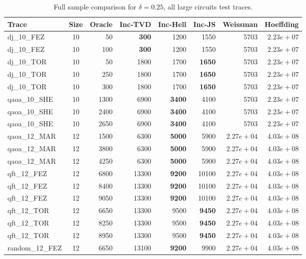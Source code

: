\clearpage
\begin{table}[ht!]
\centering
\footnotesize
\setlength{\tabcolsep}{3pt}
\renewcommand{\arraystretch}{1.05}
\caption{Full sample comparison for $\delta = 0.25$, all large circuits test traces.}
\label{tab:appendix-sota-d025-l}
\begin{tabular}{l c r r r r r r}
\toprule
Trace & Size & Oracle & Inc-TVD & Inc-Hell & Inc-JS & Weissman & Hoeffding \\
\midrule
dj\_10\_FEZ & 10 & 50 & \textbf{300} & 1200 & 1550 & 5703 & $2.23e+07$ \\
dj\_10\_FEZ & 10 & 100 & \textbf{300} & 1200 & 1550 & 5703 & $2.23e+07$ \\
dj\_10\_TOR & 10 & 50 & 1800 & 1700 & \textbf{1650} & 5703 & $2.23e+07$ \\
dj\_10\_TOR & 10 & 250 & 1800 & 1700 & \textbf{1650} & 5703 & $2.23e+07$ \\
dj\_10\_TOR & 10 & 300 & 1800 & 1700 & \textbf{1650} & 5703 & $2.23e+07$ \\
qaoa\_10\_SHE & 10 & 1300 & 6900 & \textbf{3400} & 4100 & 5703 & $2.23e+07$ \\
qaoa\_10\_SHE & 10 & 2400 & 6900 & \textbf{3400} & 4100 & 5703 & $2.23e+07$ \\
qaoa\_10\_SHE & 10 & 2650 & 6900 & \textbf{3400} & 4100 & 5703 & $2.23e+07$ \\
qaoa\_12\_MAR & 12 & 1500 & 6300 & \textbf{5000} & 5900 & $2.27e+04$ & $4.03e+08$ \\
qaoa\_12\_MAR & 12 & 3800 & 6300 & \textbf{5000} & 5900 & $2.27e+04$ & $4.03e+08$ \\
qaoa\_12\_MAR & 12 & 4250 & 6300 & \textbf{5000} & 5900 & $2.27e+04$ & $4.03e+08$ \\
qft\_12\_FEZ & 12 & 6800 & 13300 & \textbf{9200} & 10100 & $2.27e+04$ & $4.03e+08$ \\
qft\_12\_FEZ & 12 & 8400 & 13300 & \textbf{9200} & 10100 & $2.27e+04$ & $4.03e+08$ \\
qft\_12\_FEZ & 12 & 9050 & 13300 & \textbf{9200} & 10100 & $2.27e+04$ & $4.03e+08$ \\
qft\_12\_TOR & 12 & 6650 & 13300 & 9500 & \textbf{9450} & $2.27e+04$ & $4.03e+08$ \\
qft\_12\_TOR & 12 & 8250 & 13300 & 9500 & \textbf{9450} & $2.27e+04$ & $4.03e+08$ \\
qft\_12\_TOR & 12 & 8950 & 13300 & 9500 & \textbf{9450} & $2.27e+04$ & $4.03e+08$ \\
random\_12\_FEZ & 12 & 6650 & 13100 & \textbf{9200} & 9900 & $2.27e+04$ & $4.03e+08$ \\

\end{tabular}
\end{table}
